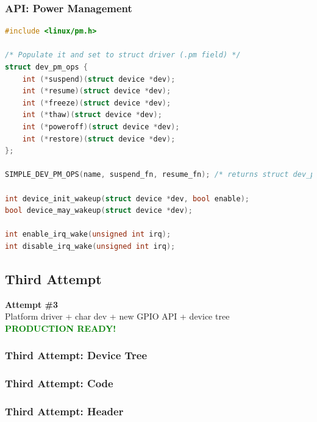 \documentclass[aspectratio=169,usenames,dvipsnames]{beamer}
\newcounter{cont}
\begin{document}
\begin{frame}[containsverbatim]
  \frametitle{API: Power Management}
  \begin{lstlisting}[language=c,numbers=none]
#include <linux/pm.h>

/* Populate it and set to struct driver (.pm field) */
struct dev_pm_ops {
	int (*suspend)(struct device *dev);
	int (*resume)(struct device *dev);
	int (*freeze)(struct device *dev);
	int (*thaw)(struct device *dev);
	int (*poweroff)(struct device *dev);
	int (*restore)(struct device *dev);
};

SIMPLE_DEV_PM_OPS(name, suspend_fn, resume_fn); /* returns struct dev_pm_ops */

int device_init_wakeup(struct device *dev, bool enable);
bool device_may_wakeup(struct device *dev);

int enable_irq_wake(unsigned int irq);
int disable_irq_wake(unsigned int irq);
  \end{lstlisting}
\end{frame}

\subsection{Third Attempt}

\begin{frame}[standout]
  \textbf{Attempt \#3} \\
  \vspace{5mm}
  Platform driver + char dev + new GPIO API + device tree  \\
  \vspace{5mm}
  \textbf{\textcolor{green}{PRODUCTION READY!}}
\end{frame}

\begin{frame}[containsverbatim]
  \frametitle{Third Attempt: Device Tree}
  
  \vspace*{-5mm}
\end{frame}

\begin{frame}[containsverbatim,allowframebreaks=1]
  \frametitle{Third Attempt: Code}
  
\end{frame}

\begin{frame}[containsverbatim]
  \frametitle{Third Attempt: Header}
  
\end{frame}
\end{document}
